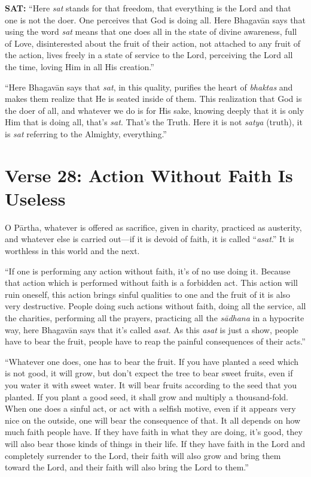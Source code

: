 \textbf{SAT:} \enquote{Here \textit{sat} stands for that freedom, that everything is the Lord and that one is not the doer. One perceives that God is doing all. Here Bhagavān says that using the word \textit{sat} means that one does all in the state of divine awareness, full of Love, disinterested about the fruit of their action, not attached to any fruit of the action, lives freely in a state of service to the Lord, perceiving the Lord all the time, loving Him in all His creation.}

\enquote{Here Bhagavān says that \textit{sat}, in this quality, purifies the heart of \textit{bhaktas} and makes them realize that He is seated inside of them. This realization that God is the doer of all, and whatever we do is for His sake, knowing deeply that it is only Him that is doing all, that’s \textit{sat}. That’s the Truth. Here it is not \textit{satya} (truth), it is \textit{sat} referring to the Almighty, everything.}
\section{Verse 28: Action Without Faith Is Useless}\label{sec-verse-28-action-without-faith-is-useless}

{O Pārtha, whatever is offered as sacrifice, given in charity, practiced as austerity, and whatever else is carried out---if it is devoid of faith, it is called \enquote{\textit{asat}.} It is worthless in this world and the next.}

\enquote{If one is performing any action without faith, it’s of no use doing it. Because that action which is performed without faith is a forbidden act. This action will ruin oneself, this action brings sinful qualities to one and the fruit of it is also very destructive. People doing such actions without faith, doing all the service, all the charities, performing all the prayers, practicing all the \textit{sādhana} in a hypocrite way, here Bhagavān says that it’s called \textit{asat}. As this \textit{asat} is just a show, people have to bear the fruit, people have to reap the painful consequences of their acts.}

\enquote{Whatever one does, one has to bear the fruit. If you have planted a seed which is not good, it will grow, but don’t expect the tree to bear sweet fruits, even if you water it with sweet water. It will bear fruits according to the seed that you planted. If you plant a good seed, it shall grow and multiply a thousand-fold. When one does a sinful act, or act with a selfish motive, even if it appears very nice on the outside, one will bear the consequence of that. It all depends on how much faith people have. If they have faith in what they are doing, it’s good, they will also bear those kinds of things in their life. If they have faith in the Lord and completely surrender to the Lord, their faith will also grow and bring them toward the Lord, and their faith will also bring the Lord to them.}

